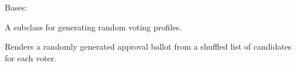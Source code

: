 \documentclass[letterpaper,10pt,english]{sphinxmanual}
\begin{document}
\begin{fulllineitems}
\label{techDoc:votingDigraphs.RandomVotingProfile}
Bases: {\hyperref[techDoc:votingDigraphs.VotingProfile]{}}

A subclass for generating random voting profiles.

\begin{fulllineitems}
\label{techDoc:votingDigraphs.RandomVotingProfile.generateRandomBallot}
Renders a randomly generated approval ballot
from a shuffled list of candidates for each voter.

\end{fulllineitems}


\end{fulllineitems}

\end{document}

